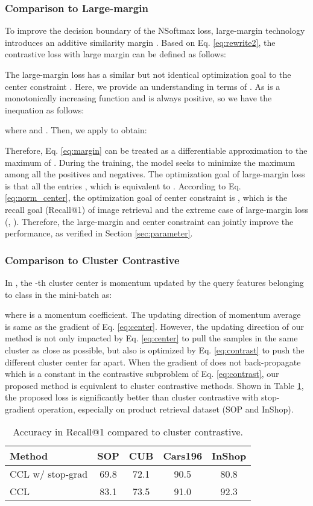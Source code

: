 \documentclass[10pt,twocolumn,letterpaper]{article}
\begin{document}
\subsubsection{Comparison to Large-margin}\label{sec:margin}
To improve the decision boundary of the NSoftmax loss, large-margin technology introduces an additive similarity margin . Based on Eq. \eqref{eq:rewrite2}, the contrastive loss with large margin can be defined as follows:

The large-margin loss has a similar but not identical optimization goal to the center constraint . Here, we provide an understanding in terms of . As  is a monotonically increasing function and  is always positive, so we have the inequation as follows:

where  and . Then, we apply  to obtain:

Therefore, Eq. \eqref{eq:margin} can be treated as a differentiable approximation to the maximum of . During the training, the model seeks to minimize the maximum among all the positives and negatives. The optimization goal of large-margin loss is that all the entries , which is equivalent to . According to Eq. \eqref{eq:norm_center}, the optimization goal of center constraint  is , which is the recall goal (Recall@1) of image retrieval and the extreme case of large-margin loss (, ). Therefore, the large-margin and center constraint can jointly improve the performance, as verified in Section \ref{sec:parameter}.

\subsubsection{Comparison to Cluster Contrastive}\label{sec:cluster} 
In \cite{spcl,prism,cluster_contrast}, the -th cluster center is momentum updated by the query features belonging to class  in the mini-batch as:

where  is a momentum coefficient. The updating direction of momentum average is same as the gradient of Eq. \eqref{eq:center}. However, the updating direction of our method is not only impacted by Eq. \eqref{eq:center} to pull the samples in the same cluster as close as possible, but also is optimized by Eq. \eqref{eq:contrast} to push the different cluster center far apart. When the gradient of  does not back-propagate which is a constant in the contrastive subproblem of Eq. \eqref{eq:contrast}, our proposed method is equivalent to cluster contrastive methods. Shown in Table \ref{tab:stop_grad}, the proposed loss is significantly better than cluster contrastive with stop-gradient operation, especially on product retrieval dataset (SOP and InShop).
\begin{table}[ht]
\centering
\begin{tabular}{l|cccc}
\hline
Method      & SOP & CUB & Cars196 & InShop \\
\hline
CCL w/ stop-grad & 69.8 & 72.1 & 90.5 & 80.8 \\
CCL         & 83.1 & 73.5 & 91.0 & 92.3 \\
\hline
\end{tabular}
\caption{Accuracy in Recall@1 compared to cluster contrastive.}
\label{tab:stop_grad}
\end{table}
\end{document}
